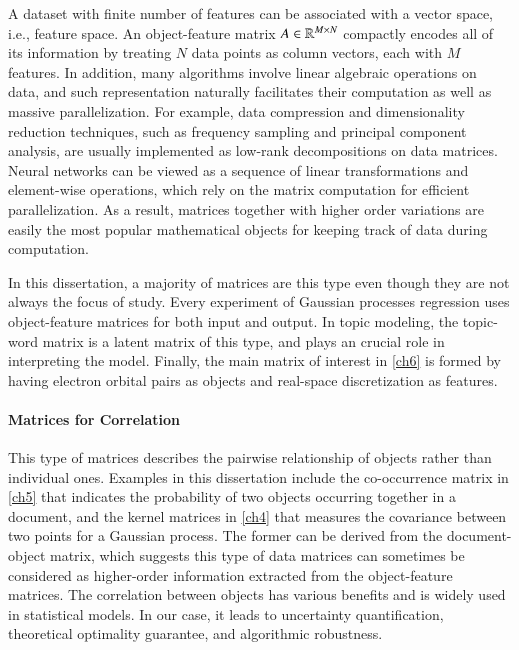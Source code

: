 A dataset with finite number of features can be associated with a vector space,
i.e., feature space. An object\hyp{}feature matrix $A\in\mathbb{R}^{M\mathbin{\times} N}$
compactly encodes all of its information by treating $N$ data points as column
vectors, each with $M$ features. In addition, many algorithms involve linear
algebraic operations on data, and such representation naturally facilitates
their computation as well as massive parallelization. For example, data
compression and dimensionality reduction techniques, such as frequency sampling
and principal component analysis, are usually implemented as low\hyp{}rank
decompositions on data matrices. Neural networks can be viewed as a sequence of
linear transformations and element\hyp{}wise operations, which rely on the
matrix computation for efficient parallelization. As a result, matrices together
with higher order variations are easily the most popular mathematical objects
for keeping track of data during computation.

In this dissertation, a majority of matrices are this type even though they are
not always the focus of study. Every experiment of Gaussian processes regression
uses object\hyp{}feature matrices for both input and output. In topic modeling,
the topic\hyp{}word matrix is a latent matrix of this type, and plays an crucial
role in interpreting the model. Finally, the main matrix of interest in 
\cref{ch6} is formed by having electron orbital pairs as objects and 
real\hyp{}space discretization as features.

\paragraph{Matrices for Correlation}

This type of matrices describes the pairwise relationship of objects rather
than individual ones. Examples in this dissertation include the 
co\hyp{}occurrence matrix in \cref{ch5} that indicates the probability of two
objects occurring together in a document, and the kernel matrices in \cref{ch4}
that measures the covariance between two points for a Gaussian process. The
former can be derived from the document\hyp{}object matrix, which suggests this
type of data matrices can sometimes be considered as higher\hyp{}order
information extracted from the object\hyp{}feature matrices. The correlation
between objects has various benefits and is widely used in statistical models.
In our case, it leads to uncertainty quantification, theoretical optimality
guarantee, and algorithmic robustness.

